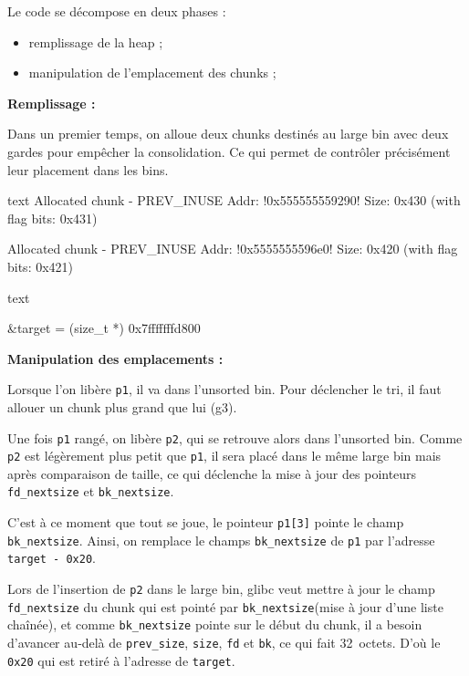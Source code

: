 Le code se décompose en deux phases :
\begin{itemize}
    \item remplissage de la heap ;
    \item manipulation de l'emplacement des chunks ;
\end{itemize}

\textbf{Remplissage :}

Dans un premier temps, on alloue deux chunks destinés au large bin avec deux gardes
pour empêcher la consolidation.
Ce qui permet de contrôler précisément leur placement dans les bins.

\begin{pwndbg}[heap]{text}
    Allocated chunk - PREV_INUSE
    Addr: !\textcolor{pwndbgred}{0x555555559290}!
    Size: 0x430 (with flag bits: 0x431)

    Allocated chunk - PREV_INUSE
    Addr: !\textcolor{pwndbgblue}{0x5555555596e0}!
    Size: 0x420 (with flag bits: 0x421)
\end{pwndbg}

\begin{pwndbg}[p \&target]{text}

    &target = (size_t *) 0x7fffffffd800

\end{pwndbg}

\textbf{Manipulation des emplacements :}

Lorsque l'on libère \texttt{p1}, il va dans l'unsorted bin. Pour déclencher le tri,
il faut allouer un chunk plus grand que lui (g3).

Une fois \texttt{p1} rangé, on libère \texttt{p2}, qui se retrouve alors dans l'unsorted bin.
Comme \texttt{p2} est légèrement plus petit que \texttt{p1}, il sera placé dans le même large bin
mais après comparaison de taille, ce qui déclenche la mise à jour des pointeurs
\texttt{fd\_nextsize} et \texttt{bk\_nextsize}.

C'est à ce moment que tout se joue, le pointeur \texttt{p1[3]} pointe le champ \texttt{bk\_nextsize}.
Ainsi, on remplace le champs \texttt{bk\_nextsize} de \texttt{p1}
par l’adresse \texttt{target - 0x20}.

Lors de l'insertion de \texttt{p2} dans le large bin, glibc veut mettre à jour
le champ \texttt{fd\_nextsize} du chunk qui est pointé par \texttt{bk\_nextsize}(mise à jour d’une liste chaînée),
et comme \texttt{bk\_nextsize} pointe sur le début du chunk, il a besoin d'avancer
au‑delà de \texttt{prev\_size}, \texttt{size}, \texttt{fd} et \texttt{bk},
ce qui fait 32~octets.
D'où le \texttt{0x20} qui est retiré à l'adresse de \texttt{target}.

